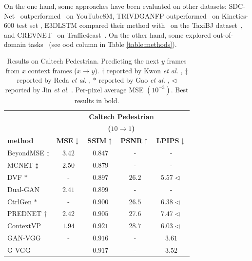 On the one hand, some approaches have been evaluated on other datasets: SDC-Net~\cite{Reda2018} outperformed~\cite{Mathieu2016,Villegas2017a} on YouTube8M, \ac{TRIVDGANFP} outperformed~\cite{Clark2019,Weissenborn2020} on Kinetics-600 test set \cite{Carreira2018}, \ac{E3DLSTM} compared their method with~\cite{Kalchbrenner2016,Oliu2018,Wang2017,Wang2018} on the TaxiBJ dataset~\cite{Zhang2017a}, and \ac{CREVNET}~\cite{Yu2020} on Traffic4cast~\cite{traffic4cast}. On the other hand, some explored out-of-domain tasks~\cite{Shi2015,Wang2019b,Brabandere2016,Vondrick2017,Yu2020} (see ood column in Table \ref{table:methods}).
\begin{table}[!t]
	\centering
	\footnotesize
	\caption{Results on Caltech Pedestrian. Predicting the next $y$ frames from $x$ context frames ($x\rightarrow y$). $\dag$ reported by Kwon \textit{et al.} \cite{Kwon2019}, $\ddag$ reported by Reda \textit{et al.} \cite{Reda2018}, $\ast$ reported by Gao \textit{et al.} \cite{Gao2019}, $\triangleleft$ reported by Jin \textit{et al.} \cite{Jin2020}. Per-pixel average \ac{MSE} $(10^{-3})$. Best results in bold.}
	\label{table:results_caltech}
	\begin{tabular} {@{}lcccc@{}} 
		\toprule
		& \multicolumn{4}{c}{\textbf{Caltech Pedestrian}} \\ 
		& \multicolumn{4}{c}{\textbf{($10\rightarrow1$)}} \\ 
		\cmidrule{2-5} 
		\textbf{method} & \textbf{\ac{MSE}}$\downarrow$ & \textbf{\ac{SSIM}}$\uparrow$ & \textbf{\ac{PSNR}}$\uparrow$ & \textbf{\ac{LPIPS}}$\downarrow$\\
		\midrule
		BeyondMSE \cite{Mathieu2016}$\ddag$ & $3.42$ & $0.847$ & - & - \\ 
		\ac{MCNET} \cite{Villegas2017a}$\ddag$ & $2.50$ & $0.879$ & - & - \\
		\ac{DVF} \cite{Liu2017}$\ast$ & - & $0.897$ & $26.2$ & $5.57\triangleleft$\\
		Dual-GAN \cite{Liang2017} & $2.41$ & $0.899$ & - & -\\
		CtrlGen \cite{Hao2018}$\ast$ & - & $0.900$ & $26.5$ & $6.38\triangleleft$ \\ 
		\ac{PREDNET} \cite{Lotter2017}$\dag$ & $2.42$ & $0.905$ & $27.6$ & $7.47\triangleleft$\\ %
		ContextVP \cite{Byeon2018} & $1.94$ & $0.921$ & $28.7$ & $6.03\triangleleft$\\ %
		GAN-VGG \cite{Shouno2020} & - & $0.916$ & - & $3.61$ \\
		G-VGG \cite{Shouno2020} & - & $0.917$ & - & $\mathbf{3.52}$ \\

\end{tabular}
\end{table}
